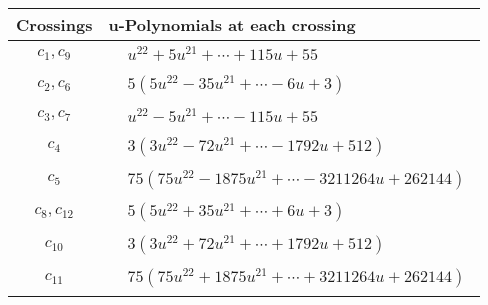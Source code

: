\documentclass[1p]{elsarticle_modified}
\theoremstyle{definition}
\begin{document}
\begin{tabular}{m{50pt}|m{274pt}}
Crossings & \hspace{64pt}u-Polynomials at each crossing \\
\hline $$\begin{aligned}c_{1},c_{9}\end{aligned}$$&$\begin{aligned}
&u^{22}+5 u^{21}+\cdots+115 u+55
\end{aligned}$\\
\hline $$\begin{aligned}c_{2},c_{6}\end{aligned}$$&$\begin{aligned}
&5(5 u^{22}-35 u^{21}+\cdots-6 u+3)
\end{aligned}$\\
\hline $$\begin{aligned}c_{3},c_{7}\end{aligned}$$&$\begin{aligned}
&u^{22}-5 u^{21}+\cdots-115 u+55
\end{aligned}$\\
\hline $$\begin{aligned}c_{4}\end{aligned}$$&$\begin{aligned}
&3(3 u^{22}-72 u^{21}+\cdots-1792 u+512)
\end{aligned}$\\
\hline $$\begin{aligned}c_{5}\end{aligned}$$&$\begin{aligned}
&75(75 u^{22}-1875 u^{21}+\cdots-3211264 u+262144)
\end{aligned}$\\
\hline $$\begin{aligned}c_{8},c_{12}\end{aligned}$$&$\begin{aligned}
&5(5 u^{22}+35 u^{21}+\cdots+6 u+3)
\end{aligned}$\\
\hline $$\begin{aligned}c_{10}\end{aligned}$$&$\begin{aligned}
&3(3 u^{22}+72 u^{21}+\cdots+1792 u+512)
\end{aligned}$\\
\hline $$\begin{aligned}c_{11}\end{aligned}$$&$\begin{aligned}
&75(75 u^{22}+1875 u^{21}+\cdots+3211264 u+262144)
\end{aligned}$\\
\hline
\end{tabular}\\~\\
\end{document}
